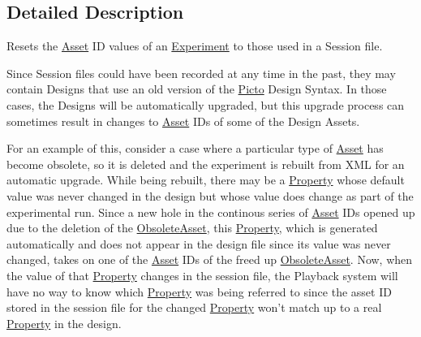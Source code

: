 \subsection{Detailed Description}
Resets the \hyperlink{class_picto_1_1_asset}{Asset} I\-D values of an \hyperlink{class_picto_1_1_experiment}{Experiment} to those used in a Session file. 

Since Session files could have been recorded at any time in the past, they may contain Designs that use an old version of the \hyperlink{namespace_picto}{Picto} Design Syntax. In those cases, the Designs will be automatically upgraded, but this upgrade process can sometimes result in changes to \hyperlink{class_picto_1_1_asset}{Asset} I\-Ds of some of the Design Assets.

For an example of this, consider a case where a particular type of \hyperlink{class_picto_1_1_asset}{Asset} has become obsolete, so it is deleted and the experiment is rebuilt from X\-M\-L for an automatic upgrade. While being rebuilt, there may be a \hyperlink{class_picto_1_1_property}{Property} whose default value was never changed in the design but whose value does change as part of the experimental run. Since a new hole in the continous series of \hyperlink{class_picto_1_1_asset}{Asset} I\-Ds opened up due to the deletion of the \hyperlink{class_picto_1_1_obsolete_asset}{Obsolete\-Asset}, this \hyperlink{class_picto_1_1_property}{Property}, which is generated automatically and does not appear in the design file since its value was never changed, takes on one of the \hyperlink{class_picto_1_1_asset}{Asset} I\-Ds of the freed up \hyperlink{class_picto_1_1_obsolete_asset}{Obsolete\-Asset}. Now, when the value of that \hyperlink{class_picto_1_1_property}{Property} changes in the session file, the Playback system will have no way to know which \hyperlink{class_picto_1_1_property}{Property} was being referred to since the asset I\-D stored in the session file for the changed \hyperlink{class_picto_1_1_property}{Property} won't match up to a real \hyperlink{class_picto_1_1_property}{Property} in the design.

